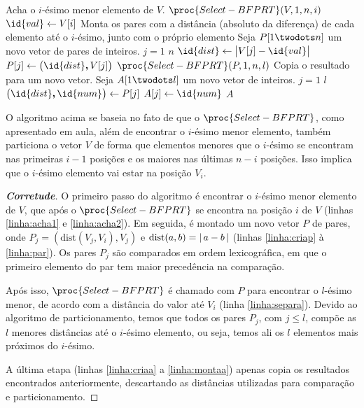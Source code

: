 \begin{codebox}
    \li \Comment Acha o $i$-ésimo menor elemento de $V$.
    \li $\proc{Select-BFPRT}(V, 1, n, i)$ \label{linha:acha1}
    \li $\id{val} \gets V[i]$   \label{linha:acha2}
    \li
    \li \Comment Monta os pares com a distância (absoluto
    \li \Comment da diferença) de cada elemento até o
    \li \Comment $i$-ésimo, junto com o próprio elemento
    \li Seja $P[1 \twodots n]$ um novo vetor de pares de inteiros. \label{linha:criap}
    \li {} $j = 1$  $n$ \label{linha:forp}
        \Do
    \li     $\id{dist} \gets \big|V[j] - \id{val}\big|$ \label{linha:dist}
    \li     $P[j] \gets \big(\id{dist}\bm{,} V[j]\big)$ \label{linha:par}
        \End
    \li $\proc{Select-BFPRT}(P, 1, n, l)$ \label{linha:separa}
    \li
    \li \Comment Copia o resultado para um novo vetor.
    \li Seja $A[1 \twodots l] $ um novo vetor de inteiros. \label{linha:criaa}
    \li {} $j = 1$  $l$ \label{linha:fora}
        \Do
    \li     $\big(\id{dist}\bm{,} \id{num}\big) \gets P[j]$ \label{linha:numa}
    \li     $A[j] \gets \id{num}$ \label{linha:montaa}
        \End
    \li
    \li {} $A$ \label{linha:reta}
\end{codebox}

\itemdsep{}

O algoritmo acima se baseia no fato de que o $\proc{Select-BFPRT}$, como apresentado em aula, além de encontrar o $i$-ésimo menor elemento, também particiona o vetor $V$ de forma que elementos menores que o $i$-ésimo se encontram nas primeiras $i-1$ posições e os maiores nas últimas $n-i$ posições. Isso implica que o $i$-ésimo elemento vai estar na posição $V_i$.

\itemdsep{}

\renewcommand{\qedsymbol}{}
\begin{proof}[\textbf{Corretude}]
    O primeiro passo do algoritmo é encontrar o $i$-ésimo menor elemento de $V$, que após o $\proc{Select-BFPRT}$ se encontra na posição $i$ de $V$ (linhas \ref{linha:acha1} e \ref{linha:acha2}). Em seguida, é montado um novo vetor $P$ de pares, onde $P_j = \left(\text{dist}(V_j, V_i), V_j\right)$ e $\text{dist}(a, b) = {\lvert\,a - b\,\rvert}$ (linhas \ref{linha:criap} à \ref{linha:par}). Os pares $P_j$ são comparados em ordem lexicográfica, em que o primeiro elemento do par tem maior precedência na comparação.

    Após isso, $\proc{Select-BFPRT}$ é chamado com $P$ para encontrar o $l$-ésimo menor, de acordo com a distância do valor até $V_i$ (linha \ref{linha:separa}). Devido ao algoritmo de particionamento, temos que todos os pares $P_j$, com $j \leq l$, compõe as $l$ menores distâncias até o $i$-ésimo elemento, ou seja, temos ali os $l$ elementos mais próximos do $i$-ésimo.

    A última etapa (linhas \ref{linha:criaa} a \ref{linha:montaa}) apenas copia os resultados encontrados anteriormente, descartando as distâncias utilizadas para comparação e particionamento.
\end{proof}

